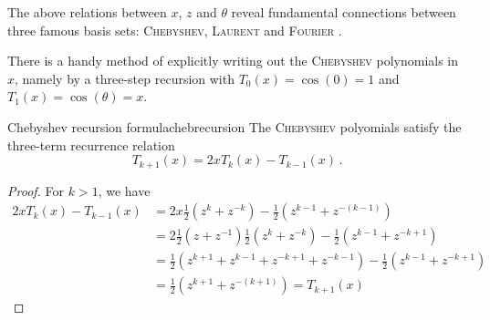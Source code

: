 \documentclass[12pt, a4paper]{article}
\newcommand{\chebyshev}{\textsc{Chebyshev}\xspace}
\begin{document}
  The above relations between $x$, $z$ and $\theta$ reveal fundamental connections between three famous basis sets: \chebyshev, \textsc{Laurent} and \textsc{Fourier} \parencite{atap}.

  There is a handy method of explicitly writing out the \chebyshev polynomials in $x$, namely by a three-step recursion with $T_0(x) = \cos(0) = 1$ and $T_1(x) = \cos(\theta) = x$.

  \begin{theorem}{Chebyshev recursion formula}{chebrecursion}
    The \chebyshev polyomials satisfy the three-term recurrence relation $$T_{k+1}(x) = 2x T_k(x) - T_{k-1}(x) \,.$$
  \end{theorem}
  \begin{proof}
    For $k > 1$, we have
    \begin{align*}
      2x T_k(x) - T_{k-1}(x) & = 2x \frac{1}{2} (z^k + z^{-k}) - \frac{1}{2} (z^{k-1} + z^{-(k-1)})                       \\
                             & = 2 \frac{1}{2}(z + z^{-1}) \frac{1}{2}(z^k + z^{-k}) - \frac{1}{2} (z^{k-1} + z^{-k+1})   \\
                             & = \frac{1}{2} (z^{k+1} + z^{k-1} + z^{-k+1} + z^{-k-1}) - \frac{1}{2} (z^{k-1} + z^{-k+1}) \\
                             & = \frac{1}{2} (z^{k+1} + z^{-(k+1)}) = T_{k+1}(x)
    \end{align*}
  \end{proof}
\end{document}
